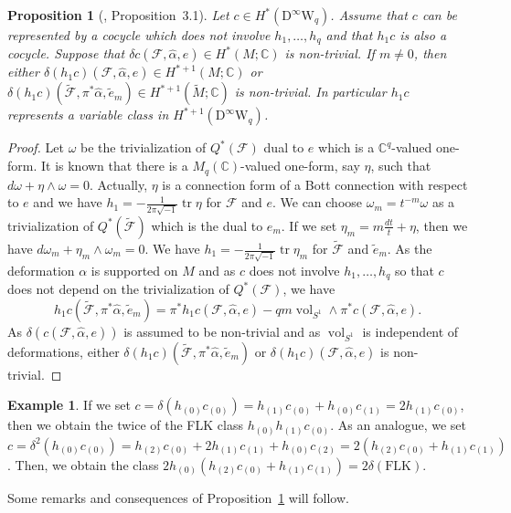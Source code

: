 \documentclass[12pt]{amsart}
\newcommand{\CF}{{\mathcal F}}
\newcommand{\C}{{\mathbb C}}
\newcommand{\FLK}{\mathrm{FLK}}
\newcommand{\W}{\mathrm{W}}
\newcommand{\D}{\mathrm{D}}
\DeclareMathOperator{\tr}{tr}
\DeclareMathOperator{\Vol}{\mathrm{vol}}
\newtheorem{proposition}[theorem]{Proposition}
\theoremstyle{definition}
\newtheorem{example}[theorem]{Example}
\theoremstyle{remark}
\begin{document}
\begin{proposition}[\cite{asuke:FLK}, Proposition~3.1]
\label{prop10.14}
Let $c\in H^*(\D^\infty\W_q)$.
Assume that $c$ can be represented by a cocycle which does not involve $h_1,\ldots,h_q$ and that $h_1c$ is also a cocycle.
Suppose that $\delta c(\CF,\widehat\alpha,e)\in H^*(M;\C)$ is non-trivial.
If $m\neq0$, then either $\delta(h_1c)(\CF,\widehat\alpha,e)\in H^{*+1}(M;\C)$ or $\delta(h_1c)(\widetilde\CF,\pi^*\widehat\alpha,\widetilde{e}_m)\in H^{*+1}(\widetilde{M};\C)$ is non-trivial.
In particular $h_1c$ represents a variable class in $H^{*+1}(\D^\infty\W_q)$.
\end{proposition}
\begin{proof}
Let $\omega$ be the trivialization of $Q^*(\CF)$ dual to $e$ which is a $\C^q$-valued one-form.
It is known that there is a $M_q(\C)$-valued one-form, say $\eta$, such that $d\omega+\eta\wedge\omega=0$.
Actually, $\eta$ is a connection form of a Bott connection with respect to $e$ and we have $h_1=-\frac1{2\pi\sqrt{-1}}\tr\eta$ for $\CF$ and $e$.
We can choose $\omega_m=t^{-m}\omega$ as a trivialization of $Q^*(\widetilde\CF)$ which is the dual to $e_m$.
If we set $\eta_m=m\frac{dt}t+\eta$, then we have $d\omega_m+\eta_m\wedge\omega_m=0$.
We have $h_1=-\frac1{2\pi\sqrt{-1}}\tr\eta_m$ for $\widetilde\CF$ and $\widetilde{e}_m$.
As the deformation $\alpha$ is supported on $M$ and as $c$ does not involve $h_1,\ldots,h_q$ so that $c$ does not depend on the trivialization of $Q^*(\CF)$, we have
\[
h_1c(\widetilde\CF,\pi^*\widehat\alpha,\widetilde{e}_m)=\pi^*h_1c(\CF,\widehat\alpha,e)-qm\Vol_{S^1}\wedge\pi^*c(\CF,\widehat\alpha,e).
\]
As $\delta(c(\CF,\widehat\alpha,e))$ is assumed to be non-trivial and as $\Vol_{S^1}$ is independent of deformations, either $\delta(h_1c)(\widetilde\CF,\pi^*\widehat\alpha,\widetilde{e}_m)$ or $\delta(h_1c)(\CF,\widehat\alpha,e)$ is non-trivial.
\end{proof}

\begin{example}
If we set $c=\delta(h_{(0)}c_{(0)})=h_{(1)}c_{(0)}+h_{(0)}c_{(1)}=2h_{(1)}c_{(0)}$, then we obtain the twice of the FLK class $h_{(0)}h_{(1)}c_{(0)}$.
As an analogue, we set $c=\delta^2(h_{(0)}c_{(0)})=h_{(2)}c_{(0)}+2h_{(1)}c_{(1)}+h_{(0)}c_{(2)}=2(h_{(2)}c_{(0)}+h_{(1)}c_{(1)})$.
Then, we obtain the class $2h_{(0)}(h_{(2)}c_{(0)}+h_{(1)}c_{(1)})=2\delta(\FLK)$.
\end{example}
Some remarks and consequences of Proposition~\ref{prop10.14} will follow.
\end{document}
